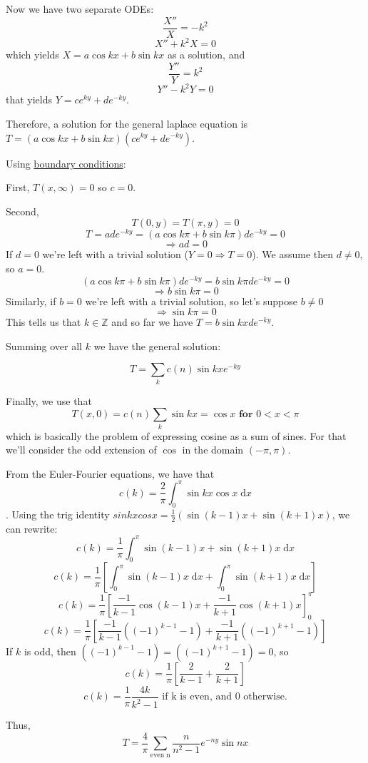 \documentclass[answers]{exam}\newcommand{\repositoryInformationSetup}{     \usepackage[dvipsnames]{xcolor}     \usepackage[ angle=90, color=black, opacity=1, scale=2, ]{background}      \SetBgPosition{current page.west}      \SetBgVshift{-4.5mm}      \backgroundsetup{contents={{\color{green}\texttt{-{}-} differs from commit \texttt{f3526e2} in 0 files}}} } \newcommand{\commit}{{{\color{green}f3526e2}}}\usepackage{amsmath}
\newcommand{\Integers}{\mathbb{Z}\xspace}
\newcommand{\integers}{\Integers}
\providecommand{\id}{}
\renewcommand{\id}[1]{\ensuremath{\; \mathrm{d}#1}}
\begin{document}
\begin{questions}
\begin{solution}
		Now we have two separate ODEs:
		$$ \frac{X''}{X} = -k^2 $$
		$$ X'' + k^2X= 0 $$
		which yields $X = a\cos kx + b\sin kx$ as a solution, and
		$$\frac{Y''}{Y} = k^2$$
		$$ Y'' - k^2Y = 0$$
		that yields $Y = ce^{ky}+de^{-ky}$.

		Therefore, a solution for the general laplace equation is $T=(a\cos kx + b\sin kx)(ce^{ky}+de^{-ky})$.

		Using \underline{boundary conditions}:

		First, $ T(x,\infty) = 0$ so $c=0$.

		Second,
		$$ T(0,y) = T(\pi,y) = 0 $$
		$$ T=ade^{-ky} = (a\cos k\pi + b\sin k\pi)de^{-ky} = 0$$
		$$ \Rightarrow ad = 0 $$
		If $d=0$ we're left with a trivial solution ($Y=0 \Rightarrow T=0$). We assume then $d\neq 0$, so $a=0$.
		$$ (a\cos k\pi + b\sin k\pi)de^{-ky} = b\sin k\pi de^{-ky} = 0$$
		$$ \Rightarrow b\sin k\pi = 0$$
		Similarly, if $b=0$ we're left with a trivial solution, so let's suppose $b\neq 0$
		$$ \Rightarrow \sin k\pi = 0$$
		This tells us that $k \in \integers$ and so far we have $T=b\sin kx de^{-ky}$.

		Summing over all $k$ we have the general solution:

		$$ T = \sum_{k} c(n) \sin kx e^{-ky} $$

		Finally, we use that
		$$ T(x,0) = c(n) \sum_{k} \sin kx  = \cos x \textbf{ for } 0<x<\pi$$
		which is basically the problem of expressing cosine as a sum of sines. For that we'll consider the odd extension of $\cos$ in the domain $(-\pi,\pi)$.

		From the Euler-Fourier equations, we have that
		$$ c(k) = \frac{2}{\pi} \int_{0}^\pi \sin kx \cos x \id{x}$$.
		Using the trig identity $ sin kx cos x = \frac{1}{2} (\sin(k-1)x+\sin(k+1)x)$, we can rewrite:
		$$ c(k) = \frac{1}{\pi} \int_{0}^\pi \sin(k-1)x+\sin(k+1)x \id{x}$$
		$$ c(k) = \frac{1}{\pi} \left[\int_{0}^\pi \sin(k-1)x \id{x} + \int_{0}^\pi \sin(k+1)x \id{x} \right] $$
		$$ c(k) = \frac{1}{\pi}  \left[\frac{-1}{k-1} \cos(k-1)x + \frac{-1}{k+1} \cos(k+1)x  \right]_0^\pi $$
		$$ c(k) = \frac{1}{\pi}  \left[\frac{-1}{k-1} ((-1)^{k-1}-1) + \frac{-1}{k+1} ((-1)^{k+1}-1) \right] $$
		If $k$ is odd, then $((-1)^{k-1}-1) = ((-1)^{k+1}-1) = 0$, so
		$$ c(k) = \frac{1}{\pi}  \left[\frac{2}{k-1}  + \frac{2}{k+1} \right]$$
		$$ c(k) = \frac{1}{\pi} \frac{4k}{k^2-1} \text{  if k is even, and 0 otherwise.} $$

		Thus,
		$$ T = \frac{4}{\pi} \sum_{\text{even n}} \frac{n}{n^2-1} e^{-ny} \sin nx   $$


\end{solution}
\end{questions}
\end{document}
